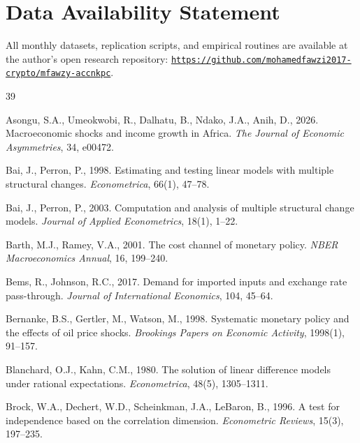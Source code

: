 \documentclass[review,12pt]{elsarticle}
\begin{document}
\section*{Data Availability Statement}
All monthly datasets, replication scripts, and empirical routines are available
at the author's open research repository: \href{https://github.com/mohamedfawzi2017-crypto/mfawzy-accnkpc}{\texttt{https://github.com/mohamedfawzi2017-crypto/mfawzy-accnkpc}}.


\begin{thebibliography}{39}

Asongu, S.A., Umeokwobi, R., Dalhatu, B., Ndako, J.A., Anih, D., 2026.
Macroeconomic shocks and income growth in Africa. \textit{The Journal of
Economic Asymmetries}, 34, e00472.

Bai, J., Perron, P., 1998. Estimating and testing linear models with multiple
structural changes. \textit{Econometrica}, 66(1), 47--78.

Bai, J., Perron, P., 2003. Computation and analysis of multiple structural
change models. \textit{Journal of Applied Econometrics}, 18(1), 1--22.

Barth, M.J., Ramey, V.A., 2001. The cost channel of monetary policy.
\textit{NBER Macroeconomics Annual}, 16, 199--240.

Bems, R., Johnson, R.C., 2017. Demand for imported inputs and exchange rate
pass-through. \textit{Journal of International Economics}, 104, 45--64.

Bernanke, B.S., Gertler, M., Watson, M., 1998. Systematic monetary policy and
the effects of oil price shocks. \textit{Brookings Papers on Economic Activity},
1998(1), 91--157.

Blanchard, O.J., Kahn, C.M., 1980. The solution of linear difference models under
rational expectations. \textit{Econometrica}, 48(5), 1305--1311.

Brock, W.A., Dechert, W.D., Scheinkman, J.A., LeBaron, B., 1996. A test for
independence based on the correlation dimension. \textit{Econometric Reviews},
15(3), 197--235.


\end{thebibliography}
\end{document}
